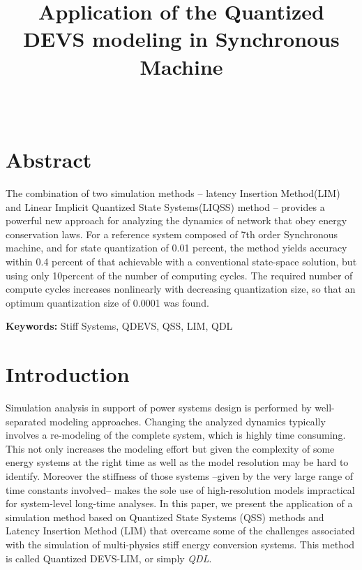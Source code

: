 \documentclass{scspaperproc}
\theoremstyle{scsthe}
\begin{document}
\SCSpagesetup{}

\def\SCSconferenceacro{}
\def\SCSpublicationyear{}
\def\SCSconferencedates{}
\def\SCSconferencevenue{}

\graphicspath{{images/}{../images/}}

\title{Application of the Quantized DEVS modeling in Synchronous Machine}

\author{
\\
}

\maketitle

\section*{Abstract}
The combination of two simulation methods -- latency Insertion Method(LIM) and Linear Implicit Quantized State Systems(LIQSS) method – provides a powerful new approach for analyzing the dynamics of network that obey energy conservation laws. For a reference system composed of 7th order Synchronous machine, and for state quantization of 0.01 percent, the method yields accuracy within 0.4 percent of that achievable with a conventional state-space solution, but using only 10percent of the number of computing cycles. The required number of compute cycles increases nonlinearly with decreasing quantization size, so that an optimum quantization size of 0.0001 was found.

\textbf{Keywords:} Stiff Systems, QDEVS, QSS, LIM, QDL

\section{Introduction}
\label{sec:intro}

Simulation analysis in support of power systems design is performed by well-separated modeling approaches. Changing the analyzed dynamics typically involves a re-modeling of the complete system, which is highly time consuming. This not only increases the modeling effort but given the complexity of some energy systems at the right time as well as the model resolution may be hard to identify. Moreover the stiffness of those systems –given by the very large range of time constants involved– makes the sole use of high-resolution models impractical for system-level long-time analyses. In this paper, we present the application of a simulation method based on Quantized State Systems (QSS) methods and Latency Insertion Method (LIM) that overcame some of the challenges associated with the simulation of multi-physics stiff energy conversion systems. This method is called Quantized DEVS-LIM, or simply \emph{QDL}.
\end{document}
